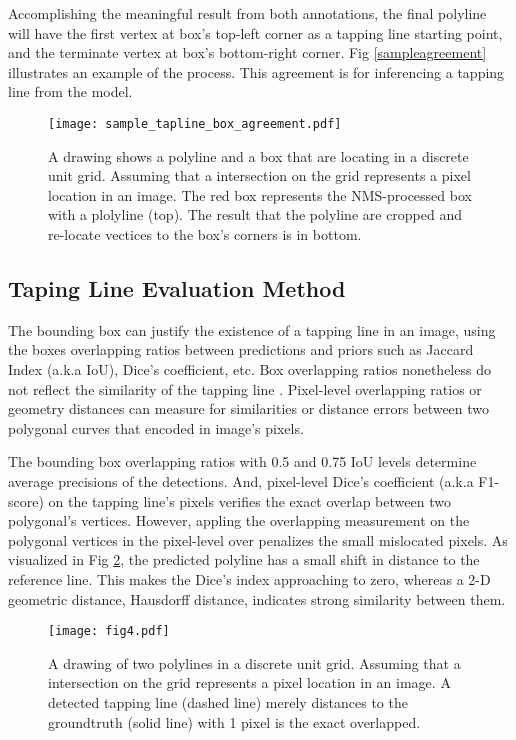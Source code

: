 \documentclass[default,pdflatex,iicol]{sn-jnl}%
\begin{document}
Accomplishing the meaningful result from both annotations, the final polyline will have the first vertex at box's top-left corner as a tapping line starting point, and the terminate vertex at box's bottom-right corner. Fig \ref{sampleagreement} illustrates an example of the process. This agreement is for inferencing a tapping line from the model.
\begin{figure}[h]%
\centering
\texttt{[image: sample\_tapline\_box\_agreement.pdf]}
\caption{A drawing shows a polyline and a box that are locating in a discrete unit grid. Assuming that a intersection on the grid represents a pixel location in an image. The red box represents the NMS-processed box with a plolyline (top). The result that the polyline are cropped and re-locate vectices to the box's corners is in bottom.
}\label{fig4-sampleagreement}
\end{figure}

\subsection{Taping Line Evaluation Method}
The bounding box can justify the existence of a tapping line in an image, using the boxes overlapping ratios between predictions and priors such as Jaccard Index (a.k.a IoU), Dice's coefficient, etc. Box overlapping ratios nonetheless do not reflect the similarity of the tapping line \cite{Wongtanawijit_2021}. Pixel-level overlapping ratios or geometry distances can measure for similarities or distance errors between two polygonal curves that encoded in image's pixels.

The bounding box overlapping ratios with 0.5 and 0.75 IoU levels determine average precisions of the detections. And, pixel-level Dice's coefficient (a.k.a F1-score) on the tapping line's pixels verifies the exact overlap between two polygonal's vertices. However, appling the overlapping measurement on the polygonal vertices in the pixel-level over penalizes the small mislocated pixels. As visualized in Fig \ref{fig4-polyline}, the predicted polyline has a small shift in distance to the reference line. This makes the Dice's index approaching to zero, whereas a 2-D geometric distance, Hausdorff distance, indicates strong similarity between them.

\begin{figure}[h]%
\centering
\texttt{[image: fig4.pdf]}
\caption{A drawing of two polylines in a discrete unit grid. Assuming that a intersection on the grid represents a pixel location in an image. A detected tapping line (dashed line) merely distances to the groundtruth (solid line) with 1 pixel is the exact overlapped.}\label{fig4-polyline}
\end{figure}
\end{document}

